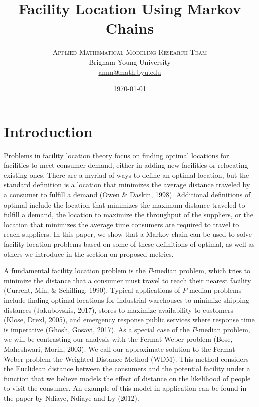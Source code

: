 \documentclass[twoside,twocolumn]{article}
\title{Facility Location Using Markov Chains}
\author{
\textsc{Applied Mathematical Modeling Research Team}\\[1ex]
\normalsize Brigham Young University \\
\normalsize \href{mailto:amm@math.byu.edu}{amm@math.byu.edu}
}
\date{\today}
\begin{document}
\maketitle

\section{Introduction}

Problems in facility location theory focus on finding optimal locations for facilities to meet consumer demand, either in adding new facilities or relocating existing ones.
There are a myriad of ways to define an optimal location, but the standard definition is a location that minimizes the average distance traveled by a consumer to fulfill a demand (Owen \& Daskin, 1998).
Additional definitions of optimal include the location that minimizes the maximum distance traveled to fulfill a demand, the location to maximize the throughput of the suppliers, or the location that minimizes the average time consumers are required to travel to reach suppliers.
In this paper, we show that a Markov chain can be used to solve facility location problems based on some of these definitions of optimal, as well as others we introduce in the section on proposed metrics.

A fundamental facility location problem is the $P$-median problem, which tries to minimize the distance that a consumer must travel to reach their nearest facility (Current, Min, \& Schilling, 1990).
Typical applications of $P$-median problems include finding optimal locations for industrial warehouses to minimize shipping distances (Jakubovskis, 2017), stores to maximize availability to customers (Klose, Drexl, 2005), and emergency response public services where response time is imperative (Ghosh, Gosavi, 2017).
As a special case of the $P$-median problem, we will be contrasting our analysis with the Fermat-Weber problem (Bose, Maheshwari, Morin, 2003).
We call our approximate solution to the Fermat-Weber problem the Weighted-Distance Method (WDM). %
This method considers the Euclidean distance between the consumers and the potential facility under a function that we believe models the effect of distance on the likelihood of people to visit the consumer. %
An example of this model in application can be found in the paper by Ndiaye, Ndiaye and Ly (2012).
\end{document}
